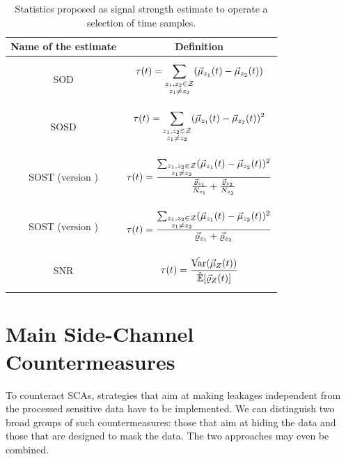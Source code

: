 \begin{table}[]
\centering
\caption{Statistics proposed as signal strength estimate to operate a selection of time samples.}
\label{table:PoIselectors}
\begin{tabular}{|c|c|}
\toprule
Name of the estimate    &  Definition\\
\midrule
SOD& \parbox{6cm}{\begin{equation*} \sPOI(t) = \sum_{\substack{\sensVar_1, \sensVar_2 \in \sensVarSet \\ \sensVar_1 \neq \sensVar_2}} (\mmmXclass[\sensVar_1](t) - \mmmXclass[\sensVar_2](t)) \end{equation*}} \\
\hline
SOSD & \parbox{6cm}{\begin{equation*} \sPOI(t) = \sum_{\substack{\sensVar_1, \sensVar_2 \in \sensVarSet \\ \sensVar_1 \neq \sensVar_2}} (\mmmXclass[\sensVar_1](t) - \mmmXclass[\sensVar_2](t))^2 \end{equation*}} \\
\hline
SOST (version \cite{gierlichs2006templates}) & \parbox{6cm}{\begin{equation*} \sPOI(t) = \frac{\sum_{\substack{\sensVar_1, \sensVar_2 \in \sensVarSet \\ \sensVar_1 \neq \sensVar_2}} (\mmmXclass[\sensVar_1](t) - \mmmXclass[\sensVar_2](t))^2}{\frac{\varXclass[\sensVar_1]}{\nbTracesPerClass[\sensVar_1]}+\frac{\varXclass[\sensVar_2]}{\nbTracesPerClass[\sensVar_2]}}  \end{equation*}}\\
\hline
SOST (version \cite{bar2010improved}) & \parbox{6cm}{\begin{equation*} \sPOI(t) = \frac{\sum_{\substack{\sensVar_1, \sensVar_2 \in \sensVarSet \\ \sensVar_1 \neq \sensVar_2}} (\mmmXclass[\sensVar_1](t) - \mmmXclass[\sensVar_2](t))^2}{\varXclass[\sensVar_1]+\varXclass[\sensVar_2]}  \end{equation*}}\\
\hline
SNR & \parbox{6cm}{\begin{equation} \sPOI(t) = \frac{\varEst(\mmmXclass[Z](t))}{\esperEst[\varXclass[Z](t)]}  \end{equation}\label{eq:SNR_formula}}\\
\hline
\end{tabular}

\end{table}

\section{Main Side-Channel Countermeasures}\label{sec:countermeasures}
To counteract SCAs, strategies that aim at making leakages independent from the processed sensitive data have to be implemented. We can distinguish two broad groups of such countermeasures: 
those that aim at hiding the data and those that are designed to mask the data. The two approaches may even be combined.

